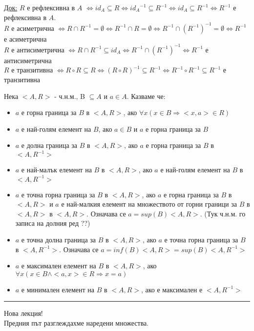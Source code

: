 \documentclass[fleqn, titlepage, 12pt]{report}
\begin{document}
\underline{Док:} $R$ е рефлексивна в
$A$ $\Longleftrightarrow id_A \subseteq R \Longleftrightarrow {id_A}^{-1} \subseteq R^{-1}
\Longleftrightarrow id_A \subseteq R^{-1} \Longleftrightarrow R^{-1}$ е рефлексивна в $A$.\\
$R$ е асиметрична $\Longleftrightarrow R \cap R^{-1} = \emptyset \Longleftrightarrow  R^{-1} \cap R = \emptyset
\Longleftrightarrow R^{-1} \cap (R^{-1})^{-1} = \emptyset \Longleftrightarrow R^{-1}$ е асиметрична\\
$R$ е антисиметрична $\Longleftrightarrow R \cap R^{-1} \subseteq id_A \Longleftrightarrow  R^{-1} \cap (R^{-1})^{-1}
\Longleftrightarrow R^{-1}$ е антисиметрична\\
$R$ е транзитивна $\Longleftrightarrow R \circ R \subseteq R \Longleftrightarrow  (R \circ R)^{-1} \subseteq R^{-1}
\Longleftrightarrow R^{-1} \circ R^{-1} \subseteq R^{-1}$ е транзитивна
\bigbreak

 Нека $<A,R>$ - ч.н.м., B $\subseteq A$ и $a \in A$. Казваме че:
\begin{itemize}
  \item $a$ е горна граница за $B$ в $<A,R>$, ако $\forall{x}(x \in B \Rightarrow <x,a> \in R)$
  \item $a$ е най-голям елемент на $B$, ако $a \in B$ и $a$ е горна граница за $B$
  \item $a$ е долна граница за $B$ в $<A,R>$, ако $a$ е горна граница за $B$ в $<A,R^{-1}>$
  \item $a$ е най-малък елемент на $B$ в $<A,R>$, ако $a$ е най-голям елемент на $B$ в $<A,R^{-1}>$
  \item $a$ е точна горна граница за $B$ в $<A,R>$, ако $a$ е горна граница за $B$ в $<A,R>$ и $a$ е най-малкия елемент
    на множеството от горни граници за $B$ в $<A,R>$ в $<A,R>$. Означава се $a = sup(B)<A,R>$.
    (Тук ч.н.м. го записа на долния ред ??)
  \item $a$ е точна долна граница за $B$ в $<A,R>$, ако $a$ е точна горна граница за $B$ в $<A,R^{-1}>$.
    Означава се $a = inf(B)<A,R> = sup(B)<A,R^{-1}>$
  \item $a$ е максимален елемент на $B$ в $<A,R>$, ако $\forall{x}(x \in B \land <a,x> \in R \Rightarrow x = a)$
  \item $a$ е минимален елемент на $B$ в $<A,R>$, ако е максимален е $<A,R^{-1}>$
\end{itemize}


\bigbreak
\hrule
\bigbreak
Нова лекция!\\
Предния път разглеждахме наредени множества.
\bigbreak
\end{document}
